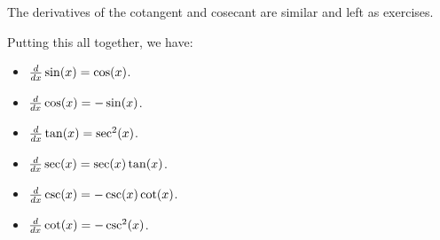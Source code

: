 The derivatives of the cotangent and cosecant are similar and left as
exercises. 

Putting this all together, we have:

\begin{mainTheorem} \hfil
\begin{itemize}
\item $\frac{d}{dx} \sin(x) = \cos(x)$.
\item $\frac{d}{dx} \cos(x) = -\sin(x)$.
\item $\frac{d}{dx} \tan(x) = \sec^2(x)$.
\item $\frac{d}{dx} \sec(x) = \sec(x)\tan(x)$.
\item $\frac{d}{dx} \csc(x) = -\csc(x)\cot(x)$.
\item $\frac{d}{dx} \cot(x) = -\csc^2(x)$.
\end{itemize}
\end{mainTheorem}



